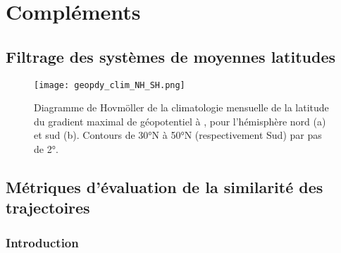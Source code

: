 \documentclass[../main.tex]{subfiles}
\begin{document}
\section{Compléments}\label{sec:complements_papier}

\subsection{Filtrage des systèmes de moyennes latitudes}\label{sec:filtrage_mid_latitudes}

\begin{figure}[htbp]
    \centering
    \texttt{[image: geopdy\_clim\_NH\_SH.png]}
    \caption{Diagramme de Hovmöller de la climatologie mensuelle de la latitude du gradient maximal de géopotentiel à , pour l'hémisphère nord (a) et
    sud (b). Contours de \ang{30}N à \ang{50}N (respectivement Sud) par pas de \ang{2}.}
    \label{fig:geopdy_clim}
\end{figure}

\subsection{Métriques d'évaluation de la similarité des trajectoires}\label{sec:similarité}

\subsubsection*{Introduction}
\end{document}

